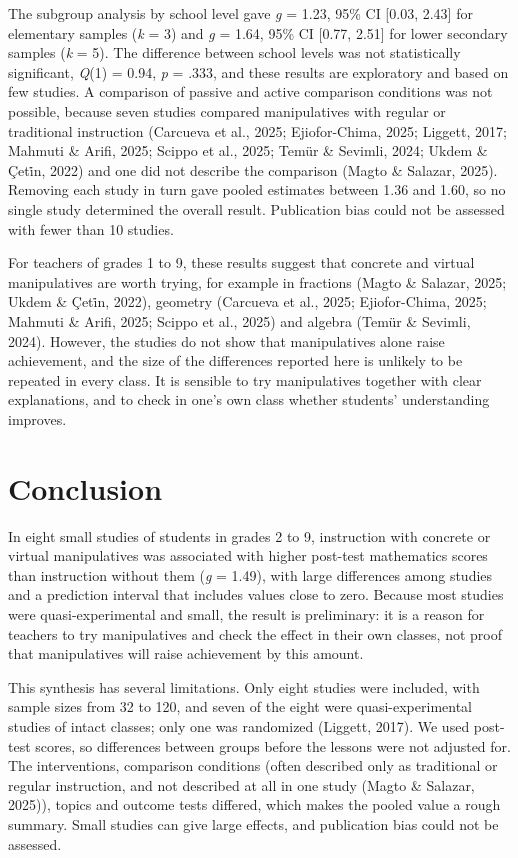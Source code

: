 \documentclass[man,a4paper,12pt,floatsintext,nolmodern,notab]{apa7}
\begin{document}
The subgroup analysis by school level gave \textit{g} = 1.23, 95\% CI [0.03, 2.43] for elementary samples (\textit{k} = 3) and \textit{g} = 1.64, 95\% CI [0.77, 2.51] for lower secondary samples (\textit{k} = 5). The difference between school levels was not statistically significant, \textit{Q}(1) = 0.94, \textit{p} = .333, and these results are exploratory and based on few studies. A comparison of passive and active comparison conditions was not possible, because seven studies compared manipulatives with regular or traditional instruction (Carcueva et al., 2025; Ejiofor-Chima, 2025; Liggett, 2017; Mahmuti \& Arifi, 2025; Scippo et al., 2025; Temür \& Sevimli, 2024; Ukdem \& Çeti̇n, 2022) and one did not describe the comparison (Magto \& Salazar, 2025). Removing each study in turn gave pooled estimates between 1.36 and 1.60, so no single study determined the overall result. Publication bias could not be assessed with fewer than 10 studies.

For teachers of grades 1 to 9, these results suggest that concrete and virtual manipulatives are worth trying, for example in fractions (Magto \& Salazar, 2025; Ukdem \& Çeti̇n, 2022), geometry (Carcueva et al., 2025; Ejiofor-Chima, 2025; Mahmuti \& Arifi, 2025; Scippo et al., 2025) and algebra (Temür \& Sevimli, 2024). However, the studies do not show that manipulatives alone raise achievement, and the size of the differences reported here is unlikely to be repeated in every class. It is sensible to try manipulatives together with clear explanations, and to check in one's own class whether students' understanding improves.

\section{Conclusion}
In eight small studies of students in grades 2 to 9, instruction with concrete or virtual manipulatives was associated with higher post-test mathematics scores than instruction without them (\textit{g} = 1.49), with large differences among studies and a prediction interval that includes values close to zero. Because most studies were quasi-experimental and small, the result is preliminary: it is a reason for teachers to try manipulatives and check the effect in their own classes, not proof that manipulatives will raise achievement by this amount.

This synthesis has several limitations. Only eight studies were included, with sample sizes from 32 to 120, and seven of the eight were quasi-experimental studies of intact classes; only one was randomized (Liggett, 2017). We used post-test scores, so differences between groups before the lessons were not adjusted for. The interventions, comparison conditions (often described only as traditional or regular instruction, and not described at all in one study (Magto \& Salazar, 2025)), topics and outcome tests differed, which makes the pooled value a rough summary. Small studies can give large effects, and publication bias could not be assessed.
\end{document}
